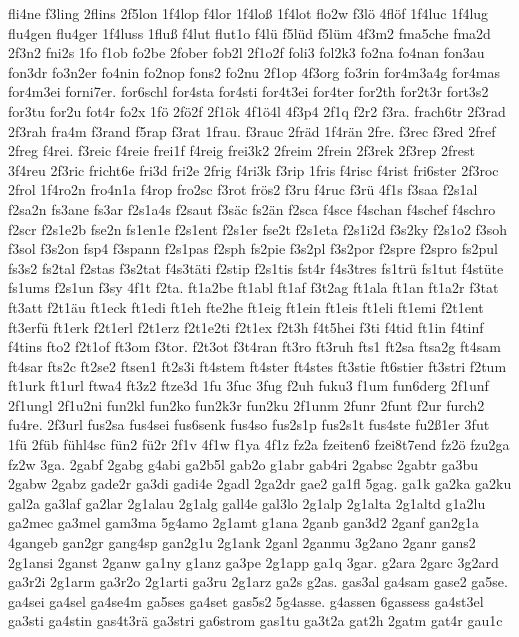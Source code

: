 {fli4ne
f3ling
2flins
2f5lon
1f4lop
f4lor
1f4loß
1f4lot
flo2w
f3lö
4flöf
1f4luc
1f4lug
flu4gen
flu4ger
1f4luss
1fluß
f4lut
flut1o
f4lü
f5lüd
f5lüm
4f3m2
fma5che
fma2d
2f3n2
fni2s
1fo
f1ob
fo2be
2fober
fob2l
2f1o2f
foli3
fol2k3
fo2na
fo4nan
fon3au
fon3dr
fo3n2er
fo4nin
fo2nop
fons2
fo2nu
2f1op
4f3org
fo3rin
for4m3a4g
for4mas
for4m3ei
forni7er.
for6schl
for4sta
for4sti
for4t3ei
for4ter
for2th
for2t3r
fort3s2
for3tu
for2u
fot4r
fo2x
1fö
2fö2f
2f1ök
4f1ö4l
4f3p4
2f1q
f2r2
f3ra.
frach6tr
2f3rad
2f3rah
fra4m
f3rand
f5rap
f3rat
1frau.
f3rauc
2fräd
1f4rän
2fre.
f3rec
f3red
2fref
2freg
f4rei.
f3reic
f4reie
frei1f
f4reig
frei3k2
2freim
2frein
2f3rek
2f3rep
2frest
3f4reu
2f3ric
fricht6e
fri3d
fri2e
2frig
f4ri3k
f3rip
1fris
f4risc
f4rist
fri6ster
2f3roc
2frol
1f4ro2n
fro4n1a
f4rop
fro2sc
f3rot
frös2
f3ru
f4ruc
f3rü
4f1s
f3saa
f2s1al
f2sa2n
fs3ane
fs3ar
f2s1a4s
f2saut
f3säc
fs2än
f2sca
f4sce
f4schan
f4schef
f4schro
f2scr
f2s1e2b
fse2n
fs1en1e
f2s1ent
f2s1er
fse2t
f2s1eta
f2s1i2d
f3s2ky
f2s1o2
f3soh
f3sol
f3s2on
fsp4
f3spann
f2s1pas
f2sph
fs2pie
f3s2pl
f3s2por
f2spre
f2spro
fs2pul
fs3s2
fs2tal
f2stas
f3s2tat
f4s3täti
f2stip
f2s1tis
fst4r
f4s3tres
fs1trü
fs1tut
f4stüte
fs1ums
f2s1un
f3sy
4f1t
f2ta.
ft1a2be
ft1abl
ft1af
f3t2ag
ft1ala
ft1an
ft1a2r
f3tat
ft3att
f2t1äu
ft1eck
ft1edi
ft1eh
fte2he
ft1eig
ft1ein
ft1eis
ft1eli
ft1emi
f2t1ent
ft3erfü
ft1erk
f2t1erl
f2t1erz
f2t1e2ti
f2t1ex
f2t3h
f4t5hei
f3ti
f4tid
ft1in
f4tinf
f4tins
fto2
f2t1of
ft3om
f3tor.
f2t3ot
f3t4ran
ft3ro
ft3ruh
fts1
ft2sa
ftsa2g
ft4sam
ft4sar
fts2c
ft2se2
ftsen1
ft2s3i
ft4stem
ft4ster
ft4stes
ft3stie
ft6stier
ft3stri
f2tum
ft1urk
ft1url
ftwa4
ft3z2
ftze3d
1fu
3fuc
3fug
f2uh
fuku3
f1um
fun6derg
2f1unf
2f1ungl
2f1u2ni
fun2kl
fun2ko
fun2k3r
fun2ku
2f1unm
2funr
2funt
f2ur
furch2
fu4re.
2f3url
fus2sa
fus4sei
fus6senk
fus4so
fus2s1p
fus2s1t
fus4ste
fu2ß1er
3fut
1fü
2füb
fühl4sc
fün2
fü2r
2f1v
4f1w
f1ya
4f1z
fz2a
fzeiten6
fzei8t7end
fz2ö
fzu2ga
fz2w
3ga.
2gabf
2gabg
g4abi
ga2b5l
gab2o
g1abr
gab4ri
2gabsc
2gabtr
ga3bu
2gabw
2gabz
gade2r
ga3di
gadi4e
2gadl
2ga2dr
gae2
ga1fl
5gag.
ga1k
ga2ka
ga2ku
gal2a
ga3laf
ga2lar
2g1alau
2g1alg
gall4e
gal3lo
2g1alp
2g1alta
2g1altd
g1a2lu
ga2mec
ga3mel
gam3ma
5g4amo
2g1amt
g1ana
2ganb
gan3d2
2ganf
gan2g1a
4gangeb
gan2gr
gang4sp
gan2g1u
2g1ank
2ganl
2ganmu
3g2ano
2ganr
gans2
2g1ansi
2ganst
2ganw
ga1ny
g1anz
ga3pe
2g1app
ga1q
3gar.
g2ara
2garc
3g2ard
ga3r2i
2g1arm
ga3r2o
2g1arti
ga3ru
2g1arz
ga2s
g2as.
gas3al
ga4sam
gase2
ga5se.
ga4sei
ga4sel
ga4se4m
ga5ses
ga4set
gas5s2
5g4asse.
g4assen
6gassess
ga4st3el
ga3sti
ga4stin
gas4t3rä
ga3stri
ga6strom
gas1tu
ga3t2a
gat2h
2gatm
gat4r
gau1c
}
